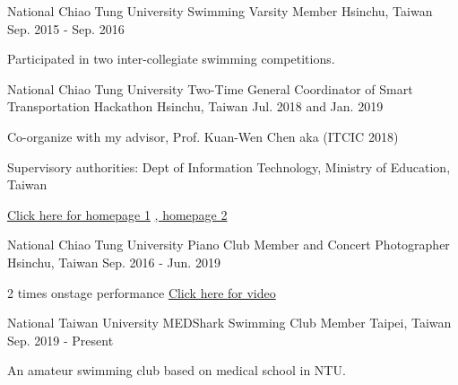 

\begin{cventries}

\cventry
    {National Chiao Tung University} %
    {Swimming Varsity Member} %
    {Hsinchu, Taiwan} %
    {Sep. 2015 - Sep. 2016} %
    {
      \begin{cvitems} %
        \item {Participated in two inter-collegiate swimming competitions.}
      \end{cvitems}
    }

\cventry
    {National Chiao Tung University} %
    {Two-Time General Coordinator of Smart Transportation Hackathon} %
    {Hsinchu, Taiwan} %
    {Jul. 2018 and Jan. 2019} %
    {
      \begin{cvitems} %
        \item {Co-organize with my advisor, Prof. Kuan-Wen Chen aka (ITCIC 2018)}
        \item {Supervisory authorities: Dept of Information Technology, Ministry of Education, Taiwan}
        \item {\href{http://covis.cs.nctu.edu.tw/ITCIC2018/}{Click here for homepage 1} \href{http://covis.cs.nctu.edu.tw/ITCIC2018/}{, homepage 2}}
      \end{cvitems}
    }

\cventry
    {National Chiao Tung University} %
    {Piano Club Member and Concert Photographer} %
    {Hsinchu, Taiwan} %
    {Sep. 2016 - Jun. 2019} %
    {
      \begin{cvitems} %
        \item {2 times onstage performance \href{}{Click here for video}}
      \end{cvitems}
    }
\cventry
    {National Taiwan University} %
    {MEDShark Swimming Club Member} %
    {Taipei, Taiwan} %
    {Sep. 2019 - Present} %
    {
      \begin{cvitems} %
        \item {An amateur swimming club based on medical school in NTU.}
      \end{cvitems}
    }
\end{cventries}
